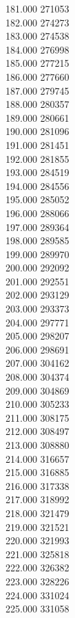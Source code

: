 { 181.000	271053 \\
 182.000	274273 \\
 183.000	274538 \\
 184.000	276998 \\
 185.000	277215 \\
 186.000	277660 \\
 187.000	279745 \\
 188.000	280357 \\
 189.000	280661 \\
 190.000	281096 \\
 191.000	281451 \\
 192.000	281855 \\
 193.000	284519 \\
 194.000	284556 \\
 195.000	285052 \\
 196.000	288066 \\
 197.000	289364 \\
 198.000	289585 \\
 199.000	289970 \\
 200.000	292092 \\
 201.000	292551 \\
 202.000	293129 \\
 203.000	293373 \\
 204.000	297771 \\
 205.000	298207 \\
 206.000	298691 \\
 207.000	304162 \\
 208.000	304374 \\
 209.000	304869 \\
 210.000	305233 \\
 211.000	308175 \\
 212.000	308497 \\
 213.000	308880 \\
 214.000	316657 \\
 215.000	316885 \\
 216.000	317338 \\
 217.000	318992 \\
 218.000	321479 \\
 219.000	321521 \\
 220.000	321993 \\
 221.000	325818 \\
 222.000	326382 \\
 223.000	328226 \\
 224.000	331024 \\
 225.000	331058 \\
}
